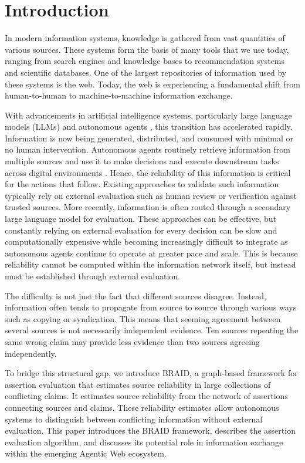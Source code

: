 \section{Introduction}

In modern information systems, knowledge is gathered from vast quantities of various sources. These systems form the basis of many tools that we use today, ranging from search engines and knowledge bases to recommendation systems and scientific databases. One of the largest repositories of information used by these systems is the web. Today, the web is experiencing a fundamental shift from human-to-human to machine-to-machine information exchange.

With advancements in artificial intelligence systems, particularly large language models (LLMs) \cite{openai2023gpt4} and autonomous agents \cite{xi2023rise}, this transition has accelerated rapidly. Information is now being generated, distributed, and consumed with minimal or no human intervention. Autonomous agents routinely retrieve information from multiple sources and use it to make decisions and execute downstream tasks across digital environments \cite{masterman2024landscape}. Hence, the reliability of this information is critical for the actions that follow. Existing approaches to validate such information typically rely on external evaluation such as human review or verification against trusted sources. More recently, information is often routed through a secondary large language model for evaluation. These approaches can be effective, but constantly relying on external evaluation for every decision can be slow and computationally expensive while becoming increasingly difficult to integrate as autonomous agents continue to operate at greater pace and scale. This is because reliability cannot be computed within the information network itself, but instead must be established through external evaluation.

The difficulty is not just the fact that different sources disagree. Instead, information often tends to propagate from source to source through various ways such as copying or syndication. This means that seeming agreement between several sources is not necessarily independent evidence. Ten sources repeating the same wrong claim may provide less evidence than two sources agreeing independently.

To bridge this structural gap, we introduce BRAID, a graph-based framework for assertion evaluation that estimates source reliability in large collections of conflicting claims. It estimates source reliability from the network of assertions connecting sources and claims. These reliability estimates allow autonomous systems to distinguish between conflicting information without external evaluation. This paper introduces the BRAID framework, describes the assertion evaluation algorithm, and discusses its potential role in information exchange within the emerging Agentic Web ecosystem.
